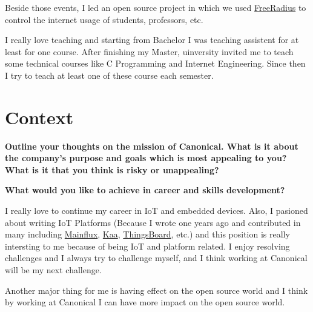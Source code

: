 Beside those events, I led an open source project in which we used \href{https://freeradius.org/}{FreeRadius}
to control the internet usage of students, professors, etc.

I really love teaching and starting from Bachelor I was teaching assistent for at least for one course.
After finishing my Master, uinversity invited me to teach some technical courses like C Programming and
Internet Engineering. Since then I try to teach at least one of these course each semester.

\section{Context}

\noindent
\textbf{Outline your thoughts on the mission of Canonical. What is it about the company's purpose and goals which is most appealing to you?
What is it that you think is risky or unappealing?}

\noindent
\textbf{What would you like to achieve in career and skills development?}

I really love to continue my career in IoT and embedded devices. Also, I pasioned about writing IoT Platforms
(Because I wrote one years ago and contributed in many including \href{https://github.com/mainflux}{Mainflux},
\href{https://github.com/kaaproject}{Kaa}, \href{https://github.com/thingsboard}{ThingsBoard}, etc.)
and this position is really intersting to me because of being IoT and platform related.
I enjoy resolving challenges and I always try to challenge myself, and I think working at Canonical will be my next challenge.

Another major thing for me is having effect on the open source world and I think by working at Canonical I can
have more impact on the open source world.
